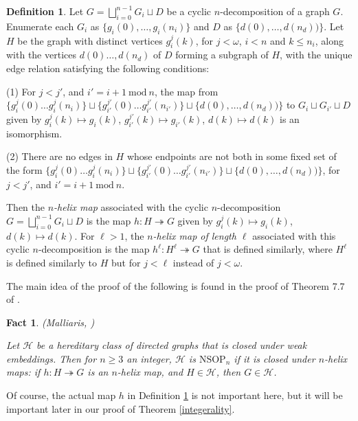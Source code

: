 \documentclass{amsart}
\newtheorem{fact}[theorem]{Fact}
\theoremstyle{definition}
\newtheorem{definition}[theorem]{Definition}
\theoremstyle{remark}
\numberwithin{equation}{section}
\begin{document}
\begin{definition}\label{helix map}
    Let $G = \bigsqcup^{n-1}_{i =0} G_{i} \sqcup D$ be a cyclic $n$-decomposition of a graph $G$. Enumerate each $G_{i}$ as $\{g_{i}(0), \ldots, g_{i}(n_{i})\}$ and $D$ as $\{d(0), \ldots, d(n_{d}))\}$. Let $H$ be the graph with distinct vertices $g^{j}_{i}(k)$, for $j < \omega$, $i < n$ and $k \leq n_{i}$, along with the vertices $d(0) \ldots, d(n_{d})$ of $D$ forming a subgraph of $H$, with the unique edge relation satisfying the following conditions:

    (1) For $j < j'$, and $i' = i + 1 \mathrm{\: mod \:} n$, the map from $\{g^{j}_{i}(0)\ldots g^{j}_{i}(n_{i})\} \sqcup \{g^{j'}_{i'}(0)\ldots g^{j'}_{i'}(n_{i'})\} \sqcup \{d(0), \ldots, d(n_{d}))\}$ to $G_{i} \sqcup G_{i'} \sqcup D$ given by $g^{j}_{i}(k) \mapsto g_{i}(k)$, $g^{j'}_{i'}(k) \mapsto g_{i'}(k)$, $d(k) \mapsto d(k)$ is an isomorphism.

    (2) There are no edges in $H$ whose endpoints are not both in some fixed set of the form $\{g^{j}_{i}(0)\ldots g^{j}_{i}(n_{i})\} \sqcup \{g^{j'}_{i'}(0)\ldots g^{j'}_{i'}(n_{i'})\} \sqcup \{d(0), \ldots, d(n_{d}))\}$, for $j < j'$, and $i' = i + 1 \mathrm{\: mod \:} n$.

    Then the \emph{$n$-helix map} associated with the cyclic $n$-decomposition $G = \bigsqcup^{n-1}_{i =0} G_{i} \sqcup D$ is the map $h: H \twoheadrightarrow G$ given by $g^{j}_{i}(k) \mapsto g_{i}(k)$, $d(k) \mapsto d(k)$. For $\ell > 1$, the \emph{$n$-helix map of length $\ell$} associated with this cyclic $n$-decomposition is the map $h^{\ell}: H^{\ell} \twoheadrightarrow G$ that is defined similarly, where $H^{\ell}$ is defined similarly to $H$ but for $j < \ell$ instead of $j < \omega$.
\end{definition}

The main idea of the proof of the following is found in the proof of Theorem 7.7 of \cite{Mal10b}. 

\begin{fact}\label{closure under helix maps} \emph{(Malliaris, \cite{Mal10b})} 

Let $\mathcal{H}$ be a hereditary class of directed graphs that is closed under weak embeddings. Then for $n \geq 3$ an integer, $\mathcal{H}$ is $\mathrm{NSOP}_{n}$ if it is closed under $n$-helix maps: if $h: H \twoheadrightarrow G$ is an $n$-helix map, and $H \in \mathcal{H}$, then $G \in \mathcal{H}$.
\end{fact}

Of course, the actual map $h$ in Definition \ref{helix map} is not important here, but it will be important later in our proof of Theorem \ref{integerality}.
\end{document}
